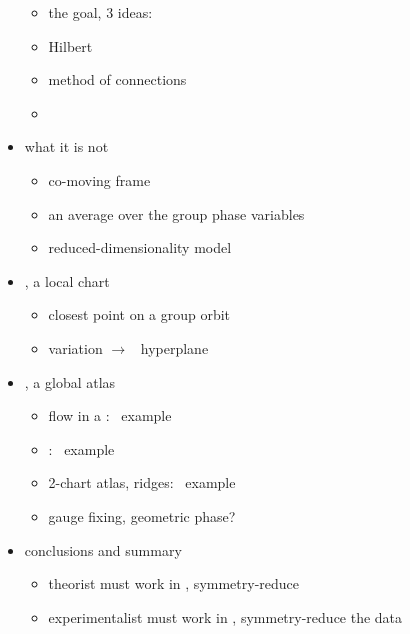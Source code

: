 \begin{itemize}
\begin{itemize}
      \item the goal, 3 ideas:
      \item Hilbert
      \item method of connections
      \item \mslices
    \end{itemize}
  \item what it is not
    \begin{itemize}
      \item co-moving frame
      \item an average over the group phase variables
      \item reduced-dimensionality model
    \end{itemize}
  \item \mslices, a local chart
    \begin{itemize}
      \item closest point on a group orbit
      \item variation $\to$ \slice\ hyperplane
    \end{itemize}
  \item \mslices, a global atlas
    \begin{itemize}
      \item flow in a \slice: \cLf\ example
      \item {\chartBord}: \cLf\ example
      \item 2-chart atlas, ridges:  \cLf\ example
      \item gauge fixing, geometric phase?
    \end{itemize}
  \item conclusions and summary
      \begin{itemize}
      \item theorist must work in \statesp, symmetry-reduce
      \item experimentalist must work in \statesp,
            symmetry-reduce the data
      \end{itemize}
\end{itemize}
